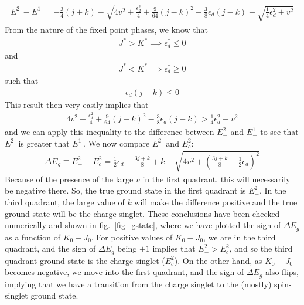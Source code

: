 \documentclass[12pt,twoside]{report}
\numberwithin{equation}{section}
\begin{document}
\begin{equation}\begin{aligned}
	E_-^2 - E_-^1= - \frac{3}{4}\left( j + k \right) - \sqrt{4v^2 + \frac{\epsilon_d^2}{4} + \frac{9}{64}\left( j - k \right) ^2 - \frac{3}{8}\epsilon_d\left( j-k \right) } + \sqrt{ \frac{1}{4}\epsilon_d^2 + v^2}
\end{aligned}\end{equation}
From the nature of the fixed point phases, we know that 
\begin{equation}\begin{aligned}
	J^* > K^* \implies \epsilon_d^* \leq 0
\end{aligned}\end{equation}
and
\begin{equation}\begin{aligned}
	J^* < K^* \implies \epsilon_d^* \geq 0
\end{aligned}\end{equation}
such that
\begin{equation}\begin{aligned}
	\epsilon_d\left( j-k \right) \leq 0
\end{aligned}\end{equation}
This result then very easily implies that
\begin{equation}\begin{aligned}
	4v^2 + \frac{\epsilon_d^2}{4} + \frac{9}{64}\left( j - k \right) ^2 - \frac{3}{8}\epsilon_d\left( j-k \right) > \frac{1}{4}\epsilon_d^2 + v^2
\end{aligned}\end{equation}
and we can apply this inequality to the difference between \(E_-^2\) and \(E_-^1\) to see that \(E_-^2\) is greater that \(E_-^1\).
\pb We now compare \(E_-^2\) and \(E_c^2\):
\begin{equation}\begin{aligned}
	\Delta E_g \equiv E_-^2 - E_c^2 = \frac{1}{2}\epsilon_d - \frac{3j + k}{8} + k - \sqrt{4v^2 + \left(\frac{3j+k}{8} -\frac{1}{2} \epsilon_d\right) ^2}
\end{aligned}\end{equation}
Because of the presence of the large \(v\) in the first quadrant, this will necessarily be negative there. So, the true ground state in the first quadrant is \(E_-^2\). In the third quadrant, the large value of \(k\) will make the difference positive and the true ground state will be the charge singlet. 
\pb These conclusions have been checked numerically and shown in fig.~\ref{fig_gstate}, where we have plotted the sign of \(\Delta E_g\) as a function of \(K_0 - J_0\). For positive values of \(K_0 - J_0\), we are in the third quadrant, and the sign of \(\Delta E_g\) being \(+1\) implies that \(E_-^2 > E_c^2\), and so the third quadrant ground state is the charge singlet (\(E_c^2\)). On the other hand, as \(K_0 - J_0\) becomes negative, we move into the first quadrant, and the sign of \(\Delta E_g\) also flips, implying that we have a transition from the charge singlet to the (mostly) spin-singlet ground state.
\end{document}
